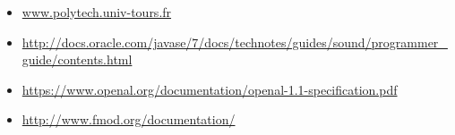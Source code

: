 \documentclass{EPUProjetPeiP}
\begin{document}
\begin{itemize}
\item \url{www.polytech.univ-tours.fr}
\item \url{http://docs.oracle.com/javase/7/docs/technotes/guides/sound/programmer_guide/contents.html}
\item \url{https://www.openal.org/documentation/openal-1.1-specification.pdf}
\item \url{http://www.fmod.org/documentation/}
\end{itemize}







\makedernierepage
\end{document}
